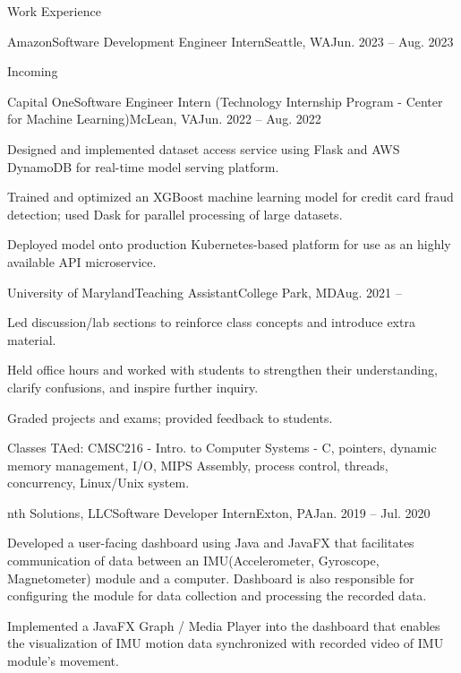 \documentclass{article}
\newlength{\tabin}
\newlength{\secsep}
\newcommand{\lineunder}{\vspace*{-8pt} \\ \hspace*{-6pt} \hrulefill \\ \vspace*{-15pt}}
\newenvironment{tabbedsection}[1]{
  \begin{list}{}{
      \setlength{\itemsep}{0pt}
      \setlength{\labelsep}{0pt}
      \setlength{\labelwidth}{0pt}
      \setlength{\leftmargin}{\tabin}
      \setlength{\rightmargin}{\tabin}
      \setlength{\listparindent}{0pt}
      \setlength{\parsep}{0pt}
      \setlength{\parskip}{0pt}
      \setlength{\partopsep}{0pt}
      \setlength{\topsep}{#1}
    }
  \item[]
}{\end{list}}
\newenvironment{resume_section}[1]{
  \filbreak
  \vspace{2\secsep}
  \textsc{\large#1}
  \lineunder
  \begin{tabbedsection}{\secsep}
}{\end{tabbedsection}}
\newenvironment{subitems}{
  \renewcommand{\labelitemi}{-}
  \begin{itemize}
      \setlength{\labelsep}{1em}
}{\end{itemize}}
\newenvironment{resume_employer}[4]{
  \vspace{\secsep}
  \textbf{#1} \\ 
  \indent {\small #2} \hfill {\footnotesize#3 (#4)} \hspace{-4em}
  \begin{tabbedsection}{0pt}
  \begin{subitems}
}{\end{subitems}\end{tabbedsection}}
\begin{document}
\begin{resume_section}{Work Experience}
\begin{resume_employer}{Amazon}{Software Development Engineer Intern}{Seattle, WA}{Jun. 2023 -- Aug. 2023}
	\item Incoming
\end{resume_employer}
\begin{resume_employer}{Capital One}{Software Engineer Intern (Technology Internship Program - Center for Machine Learning)}{McLean, VA}{Jun. 2022 -- Aug. 2022}
	\item Designed and implemented dataset access service using Flask and AWS DynamoDB for real-time model serving platform.
	\item Trained and optimized an XGBoost machine learning model for credit card fraud detection; used Dask for parallel processing of large datasets. 
	\item Deployed model onto production Kubernetes-based platform for use as an highly available API microservice.
\end{resume_employer}
\begin{resume_employer}{University of Maryland}{Teaching Assistant}{College Park, MD}{Aug. 2021 -- }
	\item Led discussion/lab sections to reinforce class concepts and introduce extra material.
	\item Held office hours and worked with students to strengthen their understanding, clarify confusions, and inspire further inquiry.
	\item Graded projects and exams; provided feedback to students.
	\item Classes TAed: CMSC216 - Intro. to Computer Systems - C, pointers, dynamic memory management, I/O, MIPS Assembly, process control, threads, concurrency, Linux/Unix system. %
\end{resume_employer}
  \begin{resume_employer}{nth Solutions, LLC}{Software Developer Intern}{Exton, PA}{Jan. 2019 -- Jul. 2020}
    \item Developed a user-facing dashboard using Java and JavaFX that facilitates communication of data between an IMU(Accelerometer, Gyroscope, Magnetometer) module and a computer. Dashboard is also responsible for configuring the module for data collection and processing the recorded data.
    \item Implemented a JavaFX Graph / Media Player into the dashboard that enables the visualization of IMU motion data synchronized with recorded video of IMU module's movement.
  \end{resume_employer}
  

\end{resume_section}
\end{document}
